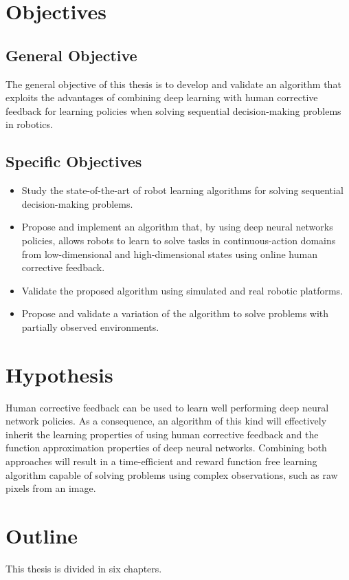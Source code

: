 \section{Objectives}
\subsection{General Objective}
The general objective of this thesis is to develop and validate an algorithm that exploits the advantages of combining deep learning with human corrective feedback for learning policies when solving sequential decision-making problems in robotics. 

\subsection{Specific Objectives}

\begin{itemize}
    \item Study the state-of-the-art of robot learning algorithms for solving sequential decision-making problems.
    \item Propose and implement an algorithm that, by using deep neural networks policies, allows robots to learn to solve tasks in continuous-action domains from low-dimensional and high-dimensional states using online human corrective feedback. 
    \item Validate the proposed algorithm using simulated and real robotic platforms.
    \item Propose and validate a variation of the algorithm to solve problems with partially observed environments.
\end{itemize}

\section{Hypothesis}
Human corrective feedback can be used to learn well performing deep neural network policies. As a consequence, an algorithm of this kind will effectively inherit the learning properties of using human corrective feedback and the function approximation properties of deep neural networks. Combining both approaches will result in a time-efficient and reward function free learning algorithm capable of solving problems using complex observations, such as raw pixels from an image.

\section{Outline}
This thesis is divided in six chapters.

